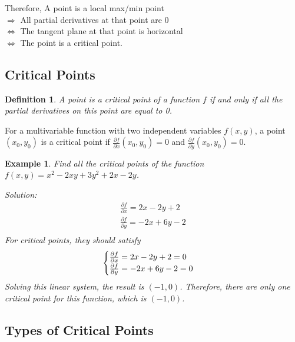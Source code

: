 \documentclass{article}
\newtheorem*{definition}{Definition}
\newtheorem{example}{Example}
\begin{document}
Therefore, A point is a local max/min point \\
$\Rightarrow$ All partial derivatives at that point are 0 \\
$\iff$ The tangent plane at that point is horizontal \\
$\iff$ The point is a critical point.

\subsection{Critical Points}

\begin{definition}
  A point is a critical point of a function $f$ if and only if all the partial 
  derivatives on this point are equal to 0.
\end{definition}
For a multivariable function with two independent variables $f(x, y)$, a point 
$(x_0, y_0)$ is a critical point if 
$\frac{\partial f}{\partial x}(x_0, y_0) = 0$ and 
$\frac{\partial f}{\partial y}(x_0, y_0) = 0$.

\begin{example}
  Find all the critical points of the function 
  $f(x, y) = x^2 - 2xy + 3y^2 + 2x - 2y$.

  Solution: \\
  \begin{gather*}
    \frac{\partial f}{\partial x} = 2x - 2y + 2 \\
    \frac{\partial f}{\partial y} = -2x + 6y - 2 \\
  \end{gather*}
  For critical points, they should satisfy 
  \begin{equation*}
    \begin{cases}
      \frac{\partial f}{\partial x} = 2x - 2y + 2 = 0 \\
      \frac{\partial f}{\partial y} = -2x + 6y - 2 = 0 \\
    \end{cases} \\
  \end{equation*}
  Solving this linear system, the result is $(-1, 0)$. Therefore, there are only 
  one critical point for this function, which is $(-1, 0)$.
\end{example}

\subsection{Types of Critical Points}
\end{document}
